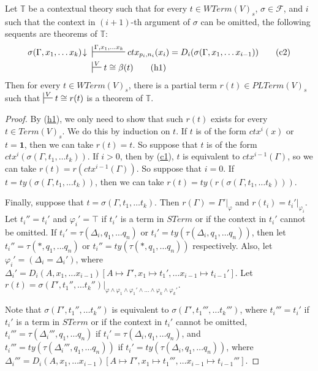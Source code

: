 \documentclass[reqno]{amsart}
\newcommand{\axtag}[1]{\label{ax:#1} \tag{#1}}
\newcommand{\axref}[1]{(\hyperref[ax:#1]{#1})}
\theoremstyle{definition}
\theoremstyle{remark}
\newcommand{\emptyCtx}{\mathbf{1}}
\numberwithin{figure}{section}
\begin{document}
\begin{prop}
Let $\mathbb{T}$ be a contextual theory such that for every $t \in WTerm(V)_s$, $\sigma \in \mathcal{F}$,
    and $i$ such that the context in $(i+1)$-th argument of $\sigma$ can be omitted, the following sequents are theorems of $\mathbb{T}$:
\begin{align*}
\sigma(\Gamma, x_1, \ldots x_k)\!\downarrow\ & \sststile{}{\Gamma, x_1, \ldots x_k} ctx_{p_i,n_i}(x_i) = D_i(\sigma(\Gamma, x_1, \ldots x_{i-1})) \axtag{c2} \\
& \sststile{}{V} t \cong \beta(t) \axtag{h1}
\end{align*}
Then for every $t \in WTerm(V)_s$, there is a partial term $r(t) \in PLTerm(V)_s$ such that $\sststile{}{V} t \cong r(t)$ is a theorem of $\mathbb{T}$.
\end{prop}
\begin{proof}
By \axref{h1}, we only need to show that such $r(t)$ exists for every $t \in Term(V)_s$.
We do this by induction on $t$.
If $t$ is of the form $ctx^i(x)$ or $t = \emptyCtx$, then we can take $r(t) = t$.
So suppose that $t$ is of the form $ctx^i(\sigma(\Gamma, t_1, \ldots t_k))$.
If $i > 0$, then by \axref{c1}, $t$ is equivalent to $ctx^{i-1}(\Gamma)$, so we can take $r(t) = r(ctx^{i-1}(\Gamma))$.
So suppose that $i = 0$.
If $t = ty(\sigma(\Gamma, t_1, \ldots t_k))$, then we can take $r(t) = ty(r(\sigma(\Gamma, t_1, \ldots t_k)))$.

Finally, suppose that $t = \sigma(\Gamma, t_1, \ldots t_k)$.
Then $r(\Gamma) = \Gamma'|_\varphi$ and $r(t_i) = t_i'|_{\varphi_i}$.
Let $t_i'' = t_i'$ and $\varphi_i' = \top$ if $t_i'$ is a term in $STerm$ or if the context in $t_i'$ cannot be omitted.
If $t_i' = \tau(\Delta_i, q_1, \ldots q_n)$ or $t_i' = ty(\tau(\Delta_i, q_1, \ldots q_n))$,
    then let $t_i'' = \tau(*, q_1, \ldots q_n)$ or $t_i'' = ty(\tau(*, q_1, \ldots q_n))$ respectively.
Also, let $\varphi_i' = (\Delta_i = \Delta_i')$, where $\Delta_i' = D_i(A, x_1, \ldots x_{i-1})[A \mapsto \Gamma', x_1 \mapsto t_1', \ldots x_{i-1} \mapsto t_{i-1}']$.
Let $r(t) = \sigma(\Gamma', t_1'', \ldots t_k'')|_{\varphi \land \varphi_1 \land \varphi_1' \land \ldots \land \varphi_k \land \varphi_k'}$.

Note that $\sigma(\Gamma', t_1'', \ldots t_k'')$ is equivalent to $\sigma(\Gamma', t_1''', \ldots t_k''')$,
    where $t_i''' = t_i'$ if $t_i'$ is a term in $STerm$ or if the context in $t_i'$ cannot be omitted,
    $t_i''' = \tau(\Delta_i''', q_1, \ldots q_n)$ if $t_i' = \tau(\Delta_i, q_1, \ldots q_n)$, and
    $t_i''' = ty(\tau(\Delta_i''', q_1, \ldots q_n))$ if $t_i' = ty(\tau(\Delta_i, q_1, \ldots q_n))$,
    where $\Delta_i''' = D_i(A, x_1, \ldots x_{i-1})[A \mapsto \Gamma', x_1 \mapsto t_1''', \ldots x_{i-1} \mapsto t_{i-1}''']$.


\end{proof}
\end{document}
